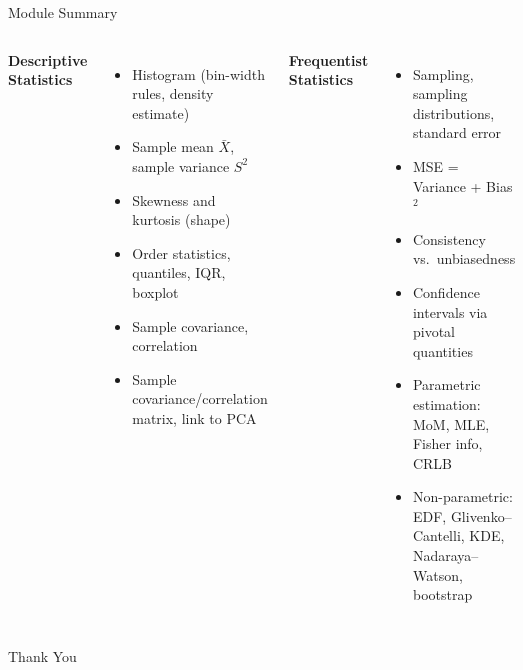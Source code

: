 \documentclass[11pt,aspectratio=169]{beamer}
\newcommand{\Xbar}{\bar{X}}
\begin{document}
\begin{frame}{Module Summary}
\begin{columns}[T]
\textbf{Descriptive Statistics}
\begin{itemize}
    \item Histogram (bin-width rules, density estimate)
    \item Sample mean $\Xbar$, sample variance $S^2$
    \item Skewness and kurtosis (shape)
    \item Order statistics, quantiles, IQR, boxplot
    \item Sample covariance, correlation
    \item Sample covariance/correlation matrix, link to PCA
\end{itemize}
\textbf{Frequentist Statistics}
\begin{itemize}
    \item Sampling, sampling distributions, standard error
    \item MSE = Variance + Bias$^2$
    \item Consistency vs.\ unbiasedness
    \item Confidence intervals via pivotal quantities
    \item Parametric estimation: MoM, MLE, Fisher info, CRLB
    \item Non-parametric: EDF, Glivenko--Cantelli, KDE,
          Nadaraya--Watson, bootstrap
\end{itemize}
\end{columns}
\end{frame}

\begin{frame}
\centering
\Huge{Thank You}\\[10pt]
\end{frame}
\end{document}
